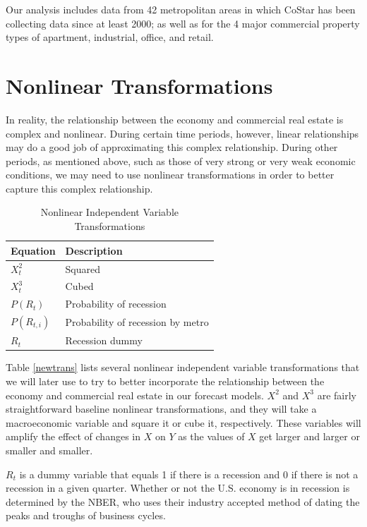 \documentclass[10pt]{article}
\begin{document}
Our analysis includes data from 42 metropolitan areas in which CoStar has been collecting data since at least 2000; as well as for the 4 major commercial property types of apartment, industrial, office, and retail.

\section*{Nonlinear Transformations}
In reality, the relationship between the economy and commercial real estate is complex and nonlinear.  During certain time periods, however, linear relationships may do a good job of approximating this complex relationship.  During other periods, as mentioned above, such as those of very strong or very weak economic conditions, we may need to use nonlinear transformations in order to better capture this complex relationship.  

\begin{table}[h]
\caption{Nonlinear Independent Variable Transformations} \label{newtrans}
\begin{center}
\begin{tabular}{l l}
Equation & Description \\ \midrule
$X^2_t$ & Squared \\
$X^3_t$ & Cubed \\
$P(R_t)$ & Probability of recession \\
$P(R_{t,i})$ & Probability of recession by metro \\
$R_t$ & Recession dummy \\
\midrule
\end{tabular}
\end{center}
\label{default}
\end{table}%

Table \ref{newtrans} lists several nonlinear independent variable transformations that we will later use to try to better incorporate the relationship between the economy and commercial real estate in our forecast models.  $X^2$ and $X^3$ are fairly straightforward baseline nonlinear transformations, and they will take a macroeconomic variable and square it or cube it, respectively.  These variables will amplify the effect of changes in $X$ on $Y$ as the values of $X$ get larger and larger or smaller and smaller.  

$R_t$ is a dummy variable that equals 1 if there is a recession and 0 if there is not a recession in a given quarter.  Whether or not the U.S. economy is in recession is determined by the NBER, who uses their industry accepted method of dating the peaks and troughs of business cycles.
\end{document}
